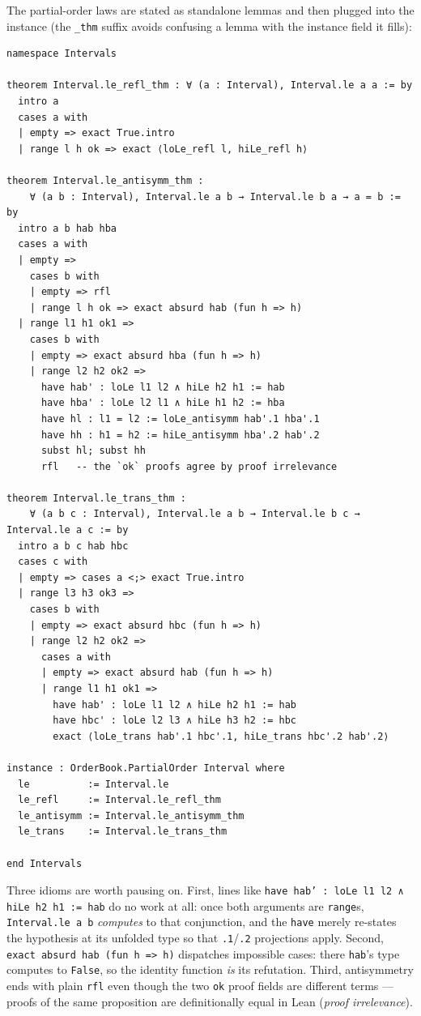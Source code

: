 \documentclass[12pt, a4paper, openright]{book}
\theoremstyle{thmstyle}
\theoremstyle{defstyle}
\newcommand{\lc}[1]{\texttt{#1}}
\begin{document}
The partial-order laws are stated as standalone lemmas and then plugged
into the instance (the \lc{\_thm} suffix avoids confusing a lemma with the
instance field it fills):

\begin{verbatim}
namespace Intervals

theorem Interval.le_refl_thm : ∀ (a : Interval), Interval.le a a := by
  intro a
  cases a with
  | empty => exact True.intro
  | range l h ok => exact ⟨loLe_refl l, hiLe_refl h⟩

theorem Interval.le_antisymm_thm :
    ∀ (a b : Interval), Interval.le a b → Interval.le b a → a = b := by
  intro a b hab hba
  cases a with
  | empty =>
    cases b with
    | empty => rfl
    | range l h ok => exact absurd hab (fun h => h)
  | range l1 h1 ok1 =>
    cases b with
    | empty => exact absurd hba (fun h => h)
    | range l2 h2 ok2 =>
      have hab' : loLe l1 l2 ∧ hiLe h2 h1 := hab
      have hba' : loLe l2 l1 ∧ hiLe h1 h2 := hba
      have hl : l1 = l2 := loLe_antisymm hab'.1 hba'.1
      have hh : h1 = h2 := hiLe_antisymm hba'.2 hab'.2
      subst hl; subst hh
      rfl   -- the `ok` proofs agree by proof irrelevance

theorem Interval.le_trans_thm :
    ∀ (a b c : Interval), Interval.le a b → Interval.le b c → Interval.le a c := by
  intro a b c hab hbc
  cases c with
  | empty => cases a <;> exact True.intro
  | range l3 h3 ok3 =>
    cases b with
    | empty => exact absurd hbc (fun h => h)
    | range l2 h2 ok2 =>
      cases a with
      | empty => exact absurd hab (fun h => h)
      | range l1 h1 ok1 =>
        have hab' : loLe l1 l2 ∧ hiLe h2 h1 := hab
        have hbc' : loLe l2 l3 ∧ hiLe h3 h2 := hbc
        exact ⟨loLe_trans hab'.1 hbc'.1, hiLe_trans hbc'.2 hab'.2⟩

instance : OrderBook.PartialOrder Interval where
  le          := Interval.le
  le_refl     := Interval.le_refl_thm
  le_antisymm := Interval.le_antisymm_thm
  le_trans    := Interval.le_trans_thm

end Intervals
\end{verbatim}

Three idioms are worth pausing on. First, lines like
\lc{have hab' : loLe l1 l2 ∧ hiLe h2 h1 := hab} do no work at all: once
both arguments are \lc{range}s, \lc{Interval.le a b} \emph{computes} to
that conjunction, and the \lc{have} merely re-states the hypothesis at its
unfolded type so that \lc{.1}/\lc{.2} projections apply. Second,
\lc{exact absurd hab (fun h => h)} dispatches impossible cases: there
\lc{hab}'s type computes to \lc{False}, so the identity function \emph{is}
its refutation. Third, antisymmetry ends with plain \lc{rfl} even though
the two \lc{ok} proof fields are different terms --- proofs of the same
proposition are definitionally equal in Lean (\emph{proof irrelevance}).
\end{document}
